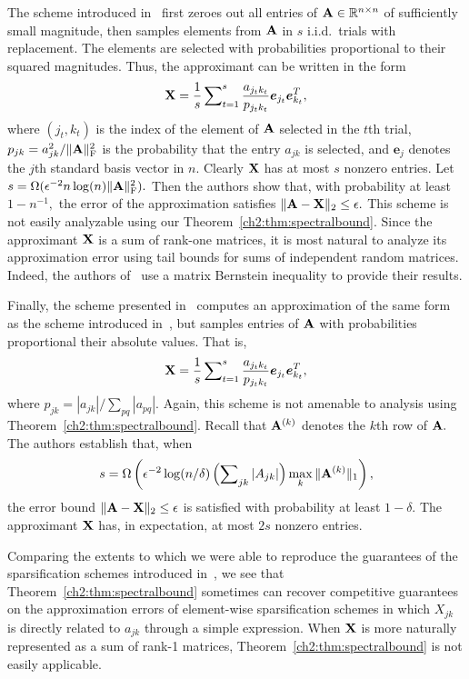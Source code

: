 The scheme introduced in~\cite{DZ11} first zeroes out all entries of $\mathbf{A} \in \mathbb{R}^{n \times n}$ of sufficiently small magnitude, then samples
elements from $\mathbf{A}$ in $s$ i.i.d.\ trials with replacement. The elements are selected with probabilities proportional to their squared
magnitudes. Thus, the approximant can be written in the form
\[
 \mathbf{X} = \frac{1}{s} \sum\nolimits_{t=1}^s \frac{a_{j_t k_t}}{p_{j_t k_t}} \boldsymbol{e}_{j_t} \boldsymbol{e}_{k_t}^T,
\]
where $(j_t, k_t)$ is the index of the element of $\mathbf{A}$ selected in the $t$th trial, $p_{jk} = a_{jk}^2/\|\mathbf{A}\|_{\mathrm{F}}^2$ is
the probability that the entry $a_{jk}$ is selected, and $\boldsymbol{e}_j$ denotes the $j$th standard basis vector in $n.$ 
Clearly $\mathbf{X}$ has at most $s$ nonzero entries. Let $s = \Omega( \epsilon^{-2} n \log( n) \|\mathbf{A}\|_{\mathrm{F}}^2).$ Then the authors show that, with probability at least $1 - n^{-1},$
the error of the approximation satisfies $\|\mathbf{A} - \mathbf{X}\|_2 \leq \epsilon.$ This scheme is not easily analyzable using our 
Theorem~\ref{ch2:thm:spectralbound}. Since the approximant $\mathbf{X}$ 
is a sum of rank-one matrices, it is most natural to analyze its approximation error using tail bounds for sums of independent
random matrices. Indeed, the authors of~\cite{DZ11} use a matrix Bernstein inequality to provide their results.

Finally, the scheme presented in~\cite{AKL13} computes an approximation of the same form as the scheme introduced in~\cite{DZ11}, but
 samples entries of $\mathbf{A}$ with probabilities proportional their absolute values. That is,
\[
 \mathbf{X} = \frac{1}{s} \sum\nolimits_{t=1}^s \frac{a_{j_t k_t}}{p_{j_t k_t}} \boldsymbol{e}_{j_t} \boldsymbol{e}_{k_t}^T,
\]
where $p_{jk} = |a_{jk}|/\sum_{pq} |a_{pq}|.$ Again, this scheme is not amenable to analysis using Theorem~\ref{ch2:thm:spectralbound}. Recall
that $\mathbf{A}^{(k)}$ denotes the $k$th row of $\mathbf{A}.$ The 
authors establish that, when 
\[ s = \Omega\left(\epsilon^{-2} \log(n/\delta) \left(\sum\nolimits_{jk} |A_{jk}|\right) \max_k \|\mathbf{A}^{(k)}\|_1\right),
\]
 the error bound $\|\mathbf{A} - \mathbf{X}\|_2 \leq \epsilon$ is satisfied with probability at least $1-\delta.$ The approximant $\mathbf{X}$ has, in expectation, at most $2s$ nonzero
entries.

Comparing the extents to which we were able to reproduce the guarantees of the sparsification schemes introduced in~\cite{AM01,AHK06,AM07,DNT10,DZ11,AKL13},
we see that Theorem~\ref{ch2:thm:spectralbound} sometimes can recover competitive guarantees on the approximation errors of element-wise sparsification schemes in which
$X_{jk}$ is directly related to $a_{jk}$ through a simple expression. When $\mathbf{X}$ is more naturally represented as 
a sum of rank-1 matrices, Theorem~\ref{ch2:thm:spectralbound} is not easily applicable. 